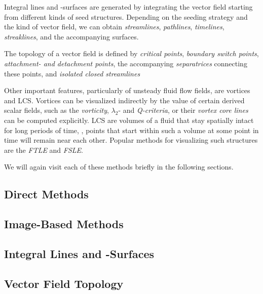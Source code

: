 %
Integral lines and -surfaces are generated by integrating the vector field
starting from different kinds of seed structures.
%
Depending on the seeding strategy and the kind of vector field, we can obtain
\emph{streamlines}, \emph{pathlines}, \emph{timelines}, \emph{streaklines},
and the accompanying surfaces.
%

%
The topology of a vector field is defined by \emph{critical points},
\emph{boundary switch points}, \emph{attachment- and detachment points}, the
accompanying \emph{separatrices} connecting these points, and \emph{isolated
closed streamlines}
%

%
Other important features, particularly of unsteady fluid flow fields, are
vortices and \ac{LCS}.
%
Vortices can be visualized indirectly by the value of certain derived scalar
fields, such as the \emph{vorticity}, \emph{$\lambda_2$}- and
\emph{Q-criteria}, or their \emph{vortex core lines} can be computed explicitly.
%
\ac{LCS} are volumes of a fluid that stay spatially intact for long periods of
time, \eg, points that start within such a volume at some point in time will
remain near each other.
%
Popular methods for visualizing such structures are the \emph{\ac{FTLE}} and
\emph{\ac{FSLE}}.
%

%
We will again visit each of these methods briefly in the following sections.
%

%
\subsection{Direct Methods} %
\label{sub:direct_methods}
%

%
\subsection{Image-Based Methods} %
\label{sub:image_based_methods}
%

%
\subsection{Integral Lines and -Surfaces} %
\label{sub:integral_lines_and_surfaces}

%
\subsection{Vector Field Topology} %
\label{sub:vector_field_topology}
%

